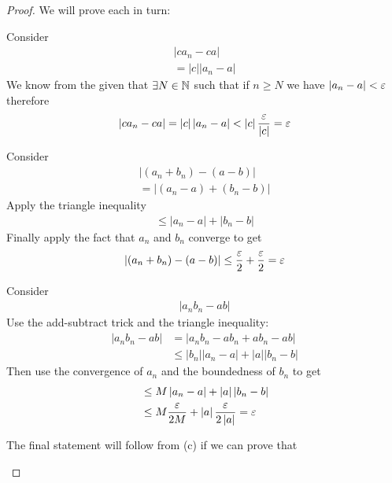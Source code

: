 \begin{proof}
	We will prove each in turn:
	\begin{alphabetize}
		\item Consider
			\begin{align}
				\left|ca_n - ca\right| \\
				= \left|c\right|\left|a_n - a\right|
			\end{align}
			We know from the given that $\exists N \in  \mathbb{N}$ such that if $n \ge N$ we have $\left|a_n - a\right| < \e$ therefore
			\begin{align}
				\left|ca_n - ca\right| = \left|c\right|\left|a_n - a\right| < \left|c\right| \frac{\e}{\left|c\right|} = \e
			\end{align}
		\item Consider
			\begin{align}
				\left|\left( a_n + b_n \right) - \left( a - b \right) \right| \\
				= \left|\left( a_n - a \right) + \left( b_n - b \right) \right|
			\end{align}
			Apply the triangle inequality
			\begin{align}
				\le \left|a_n - a\right| + \left|b_n - b\right| 
			\end{align}
			Finally apply the fact that $a_n$ and $b_n$ converge to get
			\begin{align}
				\left|\left( a_n + b_n \right) - \left( a - b \right) \right| \le \frac{\e}{2} + \frac{\e}{2} = \e
			\end{align}
		\item Consider 
			\begin{align}
				\left|a_n b_n - ab\right|
			\end{align}
			Use the add-subtract trick and the triangle inequality:
			\begin{align}
				\left|a_n b_n - ab\right| &= \left|a_n b_n - ab_n + ab_n -ab\right| \\
							  &\le \left|b_n\right|\left|a_n - a\right| + \left|a\right|\left|b_n - b\right|
			\end{align}
			Then use the convergence of $a_n$ and the boundedness of $b_n$ to get
			\begin{align}
				&\le M \left|a_n - a\right| + \left|a\right|\left|b_n - b\right| \\
				&\le M \frac{\e}{2 M} + \left|a\right|\frac{\e}{2 \left|a\right|} = \e
			\end{align}
		\item The final statement will follow from (c) if we can prove that

\end{alphabetize}
\end{proof}
